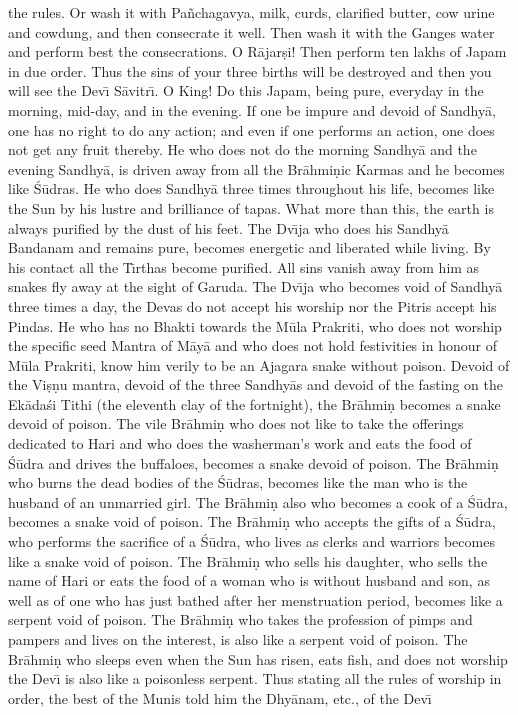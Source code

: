 the rules. Or wash it with Pa\~nchagavya, milk, curds, clarified butter, cow urine and cowdung, and then consecrate it well. Then wash it with the Ganges water and perform best the consecrations. O R\=ajar\d{s}i! Then perform ten lakhs of Japam in due order. Thus the sins of your three births will be destroyed and then you will see the Dev\={\i} S\=avitr\={\i}. O King! Do this Japam, being pure, everyday in the morning, mid-day, and in the evening. If one be impure and devoid of Sandhy\=a, one has no right to do any action; and even if one performs an action, one does not get any fruit thereby. He who does not do the morning Sandhy\=a and the evening Sandhy\=a, is driven away from all the Br\=ahmi\d{n}ic Karmas and he becomes like \'S\=udras. He who does Sandhy\=a three times throughout his life, becomes like the Sun by his lustre and brilliance of tapas. What more than this, the earth is always purified by the dust of his feet. The Dv\={\i}ja who does his Sandhy\=a Bandanam and remains pure, becomes energetic and liberated while living. By his contact all the T\={\i}rthas become purified. All sins vanish away from him as snakes fly away at the sight of Garuda. The Dv\={\i}ja who becomes void of Sandhy\=a three times a day, the Devas do not accept his worship nor the Pitris accept his Pindas. He who has no Bhakti towards the M\=ula Prakriti, who does not worship the specific seed Mantra of M\=ay\=a and who does not hold festivities in honour of M\=ula Prakriti, know him verily to be an Ajagara snake without poison. Devoid of the Vi\d{s}\d{n}u mantra, devoid of the three Sandhy\=as and devoid of the fasting on the Ek\=ada\'si Tithi (the eleventh clay of the fortnight), the Br\=ahmi\d{n} becomes a snake devoid of poison. The vile Br\=ahmi\d{n} who does not like to take the offerings dedicated to Hari and who does the washerman's work and eats the food of \'S\=udra and drives the buffaloes, becomes a snake devoid of poison. The Br\=ahmi\d{n} who burns the dead bodies of the \'S\=udras, becomes like the man who is the husband of an unmarried girl. The Br\=ahmi\d{n} also who becomes a cook of a \'S\=udra, becomes a snake void of poison. The Br\=ahmi\d{n} who accepts the gifts of a \'S\=udra, who performs the sacrifice of a \'S\=udra, who lives as clerks and warriors becomes like a snake void of poison. The Br\=ahmi\d{n} who sells his daughter, who sells the name of Hari or eats the food of a woman who is without husband and son, as well as of one who has just bathed after her menstruation period, becomes like a serpent void of poison. The Br\=ahmi\d{n} who takes the profession of pimps and pampers and lives on the interest, is also like a serpent void of poison. The Br\=ahmi\d{n} who sleeps even when the Sun has risen, eats fish, and does not worship the Dev\={\i} is also like a poisonless serpent. Thus stating all the rules of worship in order, the best of the Munis told him the Dhy\=anam, etc., of the Dev\={\i}

